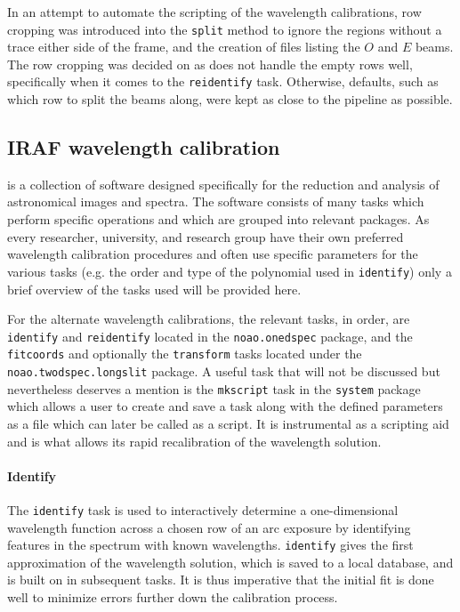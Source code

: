 In an attempt to automate the scripting of the \iraf wavelength calibrations, row cropping was introduced into the \texttt{split} method to ignore the regions without a trace either side of the frame, and the creation of files listing the $O$ and $E$ beams. The row cropping was decided on as \iraf does not handle the empty rows well, specifically when it comes to the \texttt{reidentify} task. Otherwise, defaults, such as which row to split the beams along, were kept as close to the \polsalt pipeline as possible.


\subsection{IRAF wavelength calibration}\label{subsec:IRAF_wav_cal}

\iraf is a collection of software designed specifically for the reduction and analysis of astronomical images and spectra. The software consists of many tasks which perform specific operations and which are grouped into relevant packages. As every researcher, university, and research group have their own preferred wavelength calibration procedures and often use specific parameters for the various \iraf tasks (e.g. the order and type of the polynomial used in \texttt{identify}) only a brief overview of the tasks used will be provided here.
\prgph

For the alternate wavelength calibrations, the relevant tasks, in order, are \texttt{identify} and \texttt{reidentify} located in the \texttt{noao.onedspec} package, and the \texttt{fitcoords} and optionally the \texttt{transform} tasks located under the \texttt{noao.twodspec.longslit} package. A useful \iraf task that will not be discussed but nevertheless deserves a mention is the \texttt{mkscript} task in the \texttt{system} package which allows a user to create and save a task along with the defined parameters as a file which can later be called as a script. It is instrumental as a scripting aid and is what allows \iraf its rapid recalibration of the wavelength solution.

\paragraph{Identify}
The \texttt{identify} task is used to interactively determine a one-dimensional wavelength function across a chosen row of an arc exposure by identifying features in the spectrum with known wavelengths. \texttt{identify} gives the first approximation of the wavelength solution, which is saved to a local database, and is built on in subsequent tasks. It is thus imperative that the initial fit is done well to minimize errors further down the calibration process.
\prgph

